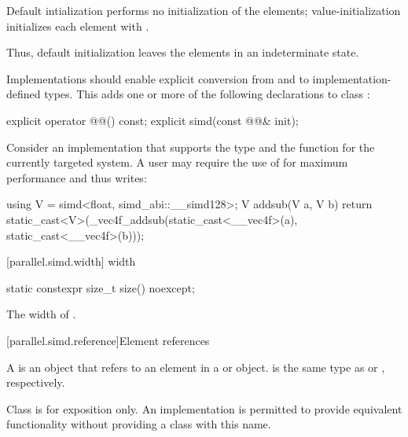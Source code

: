 \pnum
Default intialization performs no initialization of the elements; value-initialization initializes each element with . \begin{note}Thus, default initialization leaves the elements in an indeterminate state.\end{note}

\pnum
Implementations should enable explicit conversion from and to implementation-defined types. This adds one or more of the following declarations to class :

\begin{codeblock}
explicit operator @@() const;
explicit simd(const @@& init);
\end{codeblock}

\begin{example}
  Consider an implementation that supports the type  and the function  for the currently targeted system.
  A user may require the use of  for maximum performance and thus writes:
  \begin{codeblock}
    using V = simd<float, simd_abi::__simd128>;
    V addsub(V a, V b) {
      return static_cast<V>(_vec4f_addsub(static_cast<__vec4f>(a), static_cast<__vec4f>(b)));
    }
  \end{codeblock}
\end{example}

[parallel.simd.width]{ width}

\begin{itemdecl}
static constexpr size_t size() noexcept;
\end{itemdecl}

\begin{itemdescr}
  \pnum\returns
  The width of .
\end{itemdescr}

[parallel.simd.reference]{Element references}

\pnum
A  is an object that refers to an element in a  or  object.  is the same type as  or , respectively.

\pnum
Class  is for exposition only. An implementation is permitted to provide equivalent functionality without providing a class with this name.

